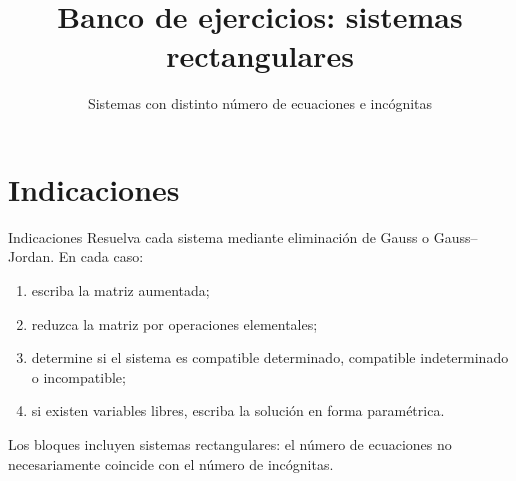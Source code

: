 \documentclass[aspectratio=169]{beamer}
\title{Banco de ejercicios: sistemas rectangulares}
\subtitle{Sistemas con distinto número de ecuaciones e incógnitas}
\begin{document}
\begin{frame}\titlepage\end{frame}
\section{Indicaciones}
\begin{frame}{Indicaciones}
\small
Resuelva cada sistema mediante eliminación de Gauss o Gauss--Jordan. En cada caso:
\begin{enumerate}
\item escriba la matriz aumentada;
\item reduzca la matriz por operaciones elementales;
\item determine si el sistema es compatible determinado, compatible indeterminado o incompatible;
\item si existen variables libres, escriba la solución en forma paramétrica.
\end{enumerate}
\medskip
Los bloques incluyen sistemas rectangulares: el número de ecuaciones no necesariamente coincide con el número de incógnitas.
\end{frame}
\end{document}
